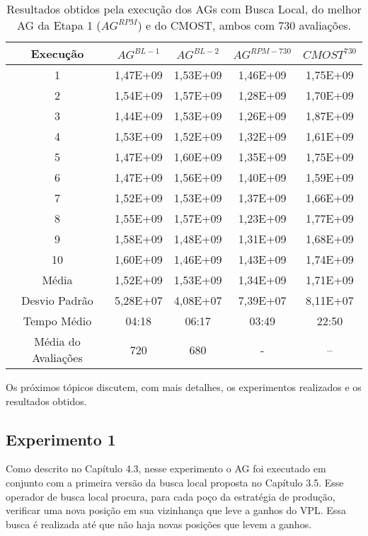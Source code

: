 \begin{table}[H]
\centering
\caption{Resultados obtidos pela execução dos AGs com Busca Local, do melhor AG da Etapa 1 ($AG^{RPM}$) e do CMOST, ambos com 730 avaliações.}
\label{tab:results2_1}
\begin{tabular}{|c|c|c|c|c|}
\hline
Execução & $AG^{BL-1}$ & $AG^{BL-2}$ & $AG^{RPM-730}$ & $CMOST^{730}$ \\ \hline
1 & 1,47E+09 & 1,53E+09 & 1,46E+09 & 1,75E+09 \\ \hline
2 & 1,54E+09 & 1,57E+09 & 1,28E+09 & 1,70E+09 \\ \hline
3 & 1,44E+09 & 1,53E+09	& 1,26E+09 & 1,87E+09 \\ \hline
4 & 1,53E+09 & 1,52E+09 & 1,32E+09 & 1,61E+09 \\ \hline
5 & 1,47E+09 & 1,60E+09 & 1,35E+09 & 1,75E+09 \\ \hline
6 & 1,47E+09 & 1,56E+09 & 1,40E+09 & 1,59E+09 \\ \hline
7 & 1,52E+09 & 1,53E+09 & 1,37E+09 & 1,66E+09 \\ \hline
8 & 1,55E+09 & 1,57E+09 & 1,23E+09 & 1,77E+09 \\ \hline
9 & 1,58E+09 & 1,48E+09 & 1,31E+09 & 1,68E+09 \\ \hline
10 & 1,60E+09 & 1,46E+09 & 1,43E+09 & 1,74E+09\\ \hline
Média & 1,52E+09 & 1,53E+09 & 1,34E+09 & 1,71E+09\\ \hline
Desvio Padrão & 5,28E+07 & 4,08E+07 & 7,39E+07 & 8,11E+07\\ \hline
Tempo Médio & 04:18 & 06:17 & 03:49 & 22:50\\ \hline
Média do Avaliações & 720 & 680	 & - & --\\ \hline

\end{tabular}
\end{table}

Os próximos tópicos discutem, com mais detalhes, os experimentos realizados e os resultados obtidos. 


\subsection{Experimento 1}
\label{ch:5_Experimento6}
Como descrito no Capítulo 4.3, nesse experimento o AG foi executado em conjunto com a primeira versão da busca local proposta no Capítulo 3.5. Esse operador de busca local procura, para cada poço da estratégia de produção, verificar uma nova posição em sua vizinhança que leve a ganhos do VPL. Essa busca é realizada até que não haja novas posições que levem a ganhos.

